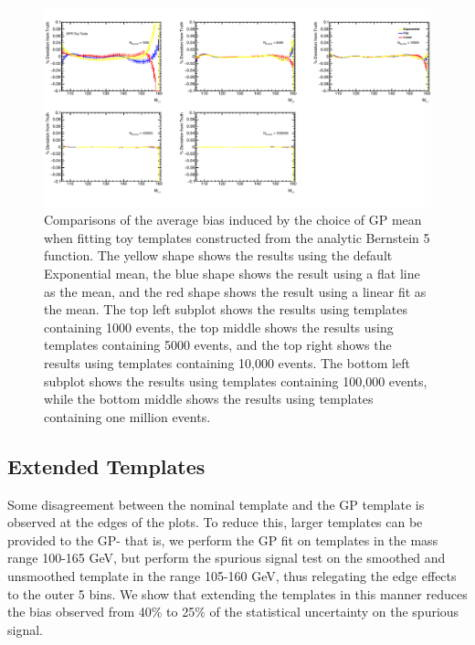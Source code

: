 \begin{figure} 
\begin{center}
  \includegraphics[width=\textwidth]{figures/background/gpr/checkBiasFromPriorChoice/Plots_GPR_PriorBiases_Bern5_crop}   
   \caption{Comparisons of the average bias induced by the choice of GP mean when fitting toy templates constructed from the analytic Bernstein 5 function. The yellow shape shows the results using the default Exponential mean, the blue shape shows the result using a flat line as the mean, and the red shape shows the result using a linear fit as the mean. The top left subplot shows the results using templates containing 1000 events, the top middle shows the results using templates containing 5000 events, and the top right shows the results using templates containing 10,000 events. The bottom left subplot shows the results using templates containing 100,000 events, while the bottom middle shows the results using templates containing one million events.}
\label{fig:prior_bias_bern5}
\end{center}
\end{figure}

\subsection{Extended Templates}

Some disagreement between the nominal template and the GP template is observed at the edges of the plots. To reduce this, larger templates can be provided to the GP- that is, we perform the GP fit on templates in the mass range 100-165 GeV, but perform the spurious signal test on the smoothed and unsmoothed template in the range 105-160 GeV, thus relegating the edge effects to the outer 5 bins. We show that extending the templates in this manner reduces the bias observed from 40\% to 25\% of the statistical uncertainty on the spurious signal.


